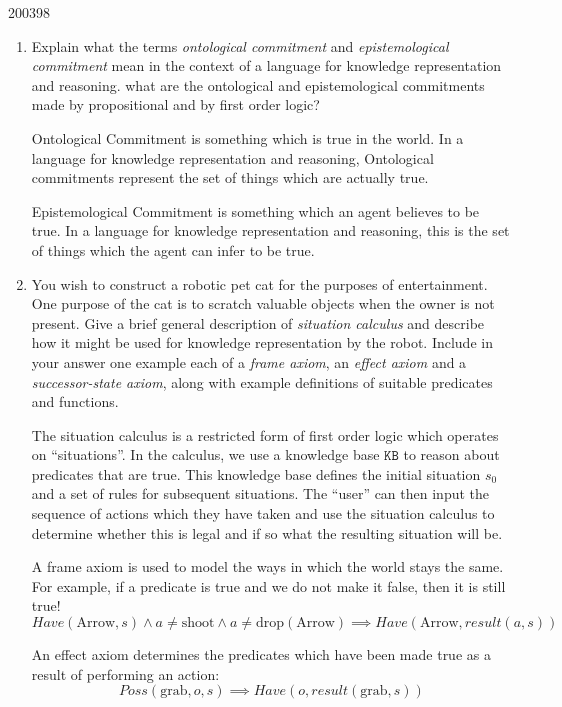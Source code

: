 \documentclass[10pt,\jkfside,a4paper]{article}
\begin{document}
\begin{examquestion}{2003}{9}{8}

\begin{enumerate}[label=(\alph*)]

\item
Explain what the terms \textit{ontological commitment} and \textit{
epistemological commitment} mean in the context of a language for knowledge
representation and reasoning. what are the ontological and epistemological
commitments made by propositional and by first order logic?

Ontological Commitment is something which is true in the world. In a
language for knowledge representation and reasoning, Ontological commitments
represent the set of things which are actually true.

Epistemological Commitment is something which an agent believes to be true.
In a language for knowledge representation and reasoning, this is the set of
things which the agent can infer to be true.

\item You wish to construct a robotic pet cat for the purposes of
entertainment. One purpose of the cat is to scratch valuable objects when
the owner is not present. Give a brief general description of
\textit{situation calculus} and describe how it might be used for knowledge
representation by the robot. Include in your answer one example each of a
\textit{frame axiom}, an \textit{effect axiom} and a \textit{successor-state
axiom}, along with example definitions of suitable predicates and functions.

The situation calculus is a restricted form of first order logic which operates
on ``situations''. In the calculus, we use a knowledge base $\texttt{KB}$ to
reason about predicates that are true. This knowledge base defines the
initial situation $s_0$ and a set of rules for subsequent situations. The
``user'' can then input the sequence of actions which they have taken and
use the situation calculus to determine whether this is legal and if so what
the resulting situation will be.

A frame axiom is used to model the ways in which the world stays the same.
For example, if a predicate is true and we do not make it false, then it is
still true!
\[
Have(\text{Arrow}, s) \wedge a \neq \text{shoot} \wedge
a \neq \text{drop}(\text{Arrow}) \implies Have(\text{Arrow}, result(a, s))
\]

An effect axiom determines the predicates which have been made true as a
result of performing an action:
\[
Poss(\text{grab}, o, s) \implies Have(o, result(\text{grab}, s))
\]


\end{enumerate}
\end{examquestion}
\end{document}
